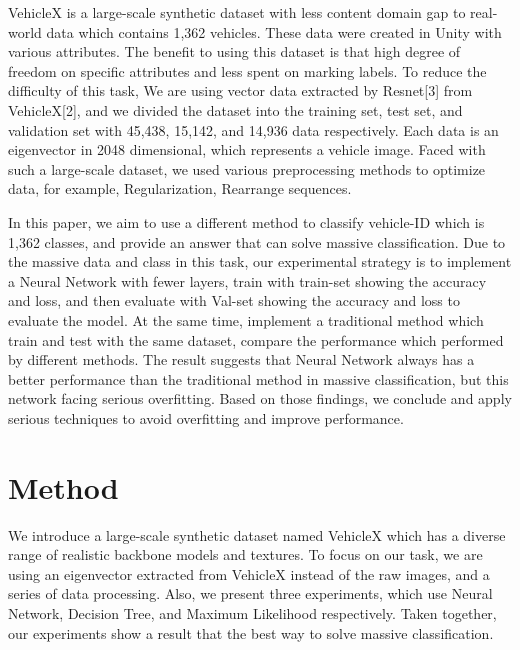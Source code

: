 \documentclass[runningheads]{llncs}
\begin{document}
VehicleX is a large-scale synthetic dataset with less content domain gap to real-world data which contains 1,362 vehicles. These data were created in Unity with various attributes. The benefit to using this dataset is that high degree of freedom on specific attributes and less spent on marking labels. To reduce the difficulty of this task, We are using vector data extracted by Resnet[3] from VehicleX[2], and we divided the dataset into the training set, test set, and validation set with 45,438, 15,142, and 14,936 data respectively. Each data is an eigenvector in 2048 dimensional, which represents a vehicle image. Faced with such a large-scale dataset, we used various preprocessing methods to optimize data, for example, Regularization, Rearrange sequences.

In this paper, we aim to use a different method to classify vehicle-ID which is 1,362 classes, and provide an answer that can solve massive classification. Due to the massive data and class in this task, our experimental strategy is to implement a Neural Network with fewer layers, train with train-set showing the accuracy and loss, and then evaluate with Val-set showing the accuracy and loss to evaluate the model. At the same time, implement a traditional method which train and test with the same dataset, compare the performance which performed by different methods. The result suggests that Neural Network always has a better performance than the traditional method in massive classification, but this network facing serious overfitting. Based on those findings, we conclude and apply serious techniques to avoid overfitting and improve performance.


\section{Method}
We introduce a large-scale synthetic dataset named VehicleX which has a diverse range of realistic backbone models and textures. To focus on our task, we are using an eigenvector extracted from VehicleX instead of the raw images, and a series of data processing. Also, we present three experiments, which use Neural Network, Decision Tree, and Maximum Likelihood respectively. Taken together, our experiments show a result that the best way to solve massive classification.
\end{document}
